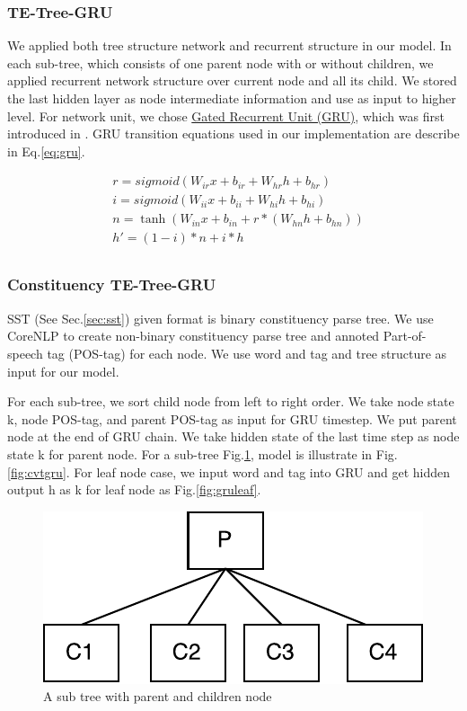 \subsubsection{TE-Tree-GRU}
We applied both tree structure network and recurrent structure in our model. 
In each sub-tree, which consists of one parent node with or without children, we applied recurrent network structure over current node and all its child. 
We stored the last hidden layer as node intermediate information and use as input to higher level. 
For network unit, we chose \hyperref[sec:GRU]{Gated Recurrent Unit (GRU)}, which was first introduced in \cite{cho2014learning}. 
GRU transition equations used in our implementation are describe in Eq.\ref{eq:gru}. 

\begin{equation}
\label{eq:gru}
\begin{aligned}
&r = sigmoid(W_{ir} x + b_{ir} + W_{hr} h + b_{hr}) \\
&i = sigmoid(W_{ii} x + b_{ii} + W_{hi} h + b_{hi}) \\
&n = \tanh(W_{in} x + b_{in} + r * (W_{hn} h + b_{hn})) \\
&h' = (1 - i) * n + i * h\\
\end{aligned}
\end{equation}

\subsubsection{Constituency TE-Tree-GRU} \label{sec:VTtreeConstituency}
SST (See Sec.\ref{sec:sst}) given format is binary constituency parse tree. We use CoreNLP \cite{manning2014stanford} to create non-binary constituency parse tree and annoted Part-of-speech tag (POS-tag) for each node. We use word and tag and tree structure as input for our model.

For each sub-tree, we sort child node from left to right order. We take node state k, node POS-tag, and parent POS-tag as input for GRU timestep. We put parent node at the end of GRU chain. We take hidden state of the last time step as node state k for parent node. For a sub-tree Fig.\ref{fig:treecp}, model is illustrate in Fig.\ref{fig:cvtgru}. For leaf node case, we input word and tag into GRU and get hidden output h as k for leaf node as Fig.\ref{fig:gruleaf}.
\begin{figure}[H]
    \centering
    \includegraphics[width=0.5\linewidth]{figure/treecp}
    \caption[A sub tree with parent and children node]{A sub tree with parent and children node}
    \label{fig:treecp}
\end{figure}

